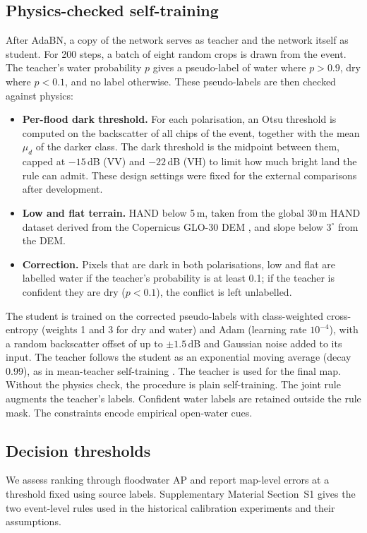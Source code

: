 \documentclass[a4paper,fleqn]{cas-sc}
\begin{document}
\subsection{Physics-checked self-training}
After AdaBN, a copy of the network serves as teacher and the network itself as student. For 200 steps, a batch of eight random crops is drawn from the event. The teacher's water probability $p$ gives a pseudo-label of water where $p>0.9$, dry where $p<0.1$, and no label otherwise. These pseudo-labels are then checked against physics:
\begin{itemize}
\item \textbf{Per-flood dark threshold.} For each polarisation, an Otsu threshold \citep{otsu1979threshold} is computed on the backscatter of all chips of the event, together with the mean $\mu_d$ of the darker class. The dark threshold is the midpoint between them, capped at $-15$\,dB (VV) and $-22$\,dB (VH) to limit how much bright land the rule can admit. These design settings were fixed for the external comparisons after development.
\item \textbf{Low and flat terrain.} HAND below 5\,m, taken from the global 30\,m HAND dataset derived from the Copernicus GLO-30 DEM \citep{glo30hand2022}, and slope below $3^\circ$ from the DEM.
\item \textbf{Correction.} Pixels that are dark in both polarisations, low and flat are labelled water if the teacher's probability is at least 0.1; if the teacher is confident they are dry ($p<0.1$), the conflict is left unlabelled.
\end{itemize}
The student is trained on the corrected pseudo-labels with class-weighted cross-entropy (weights 1 and 3 for dry and water) and Adam (learning rate $10^{-4}$), with a random backscatter offset of up to $\pm1.5$\,dB and Gaussian noise added to its input. The teacher follows the student as an exponential moving average (decay 0.99), as in mean-teacher self-training \citep{tarvainen2017meanteacher,chen2026cimttda}. The teacher is used for the final map. Without the physics check, the procedure is plain self-training.
The joint rule augments the teacher's labels. Confident water labels are retained outside the rule mask. The constraints encode empirical open-water cues.

\subsection{Decision thresholds}
We assess ranking through floodwater AP and report map-level errors at a threshold fixed using source labels. Supplementary Material Section~S1 gives the two event-level rules used in the historical calibration experiments and their assumptions.
\end{document}

